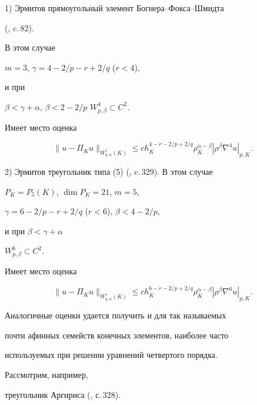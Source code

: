1) Эрмитов прямоугольный элемент Богнера--Фокса--Шмидта 


(\cite{Ciarle}, c.\,82).


В этом случае 


$m=3$, $\gamma = 4-2/p - r+2/q$ ($r<4$), 


и при 


$ \beta < \gamma+\alpha$, $\beta < 2-2/p$\; $W_{p,\beta}^4 \subset C^2 $. 


Имеет место оценка


\begin{equation} \label{Bogn} 


\| {u-\Pi_K u} \|_{W_{q,\alpha }^r( K )}\le 


ch_K^{4-r-2/p+2/q}\rho _K^{\alpha -\beta }| {\rho ^\beta 


\nabla ^4u} |_{p,K}.


\end{equation}





2) Эрмитов треугольник типа (5) (\cite{Ciarle}, c.\,329). В этом случае 


$P_K=P_5(K)$, $\dim P_K=21$, $m=5$, 


$\gamma = 6-2/p - r+2/q$ ($r<6$), $\beta < 4 - 2/p$,


и при $\beta < \gamma+\alpha$\; 


$W_{p,\beta}^6 \subset C^2$. 


Имеет место оценка


\begin{equation} \label{Tip5} 


\| {u-\Pi_K u} \|_{W_{q,\alpha }^r( K )}\le 


ch_K^{6-r-2/p+2/q}\rho _K^{\alpha -\beta }| {\rho ^\beta 


\nabla ^6u} |_{p,K}.


\end{equation}





Аналогичные оценки удается получить и для так называемых 


почти афинных семейств конечных элементов, наиболее часто 


используемых при решении уравнений четвертого порядка.





Рассмотрим, например, 


треугольник Аргириса (\cite{Ciarle}, с.\,328).





